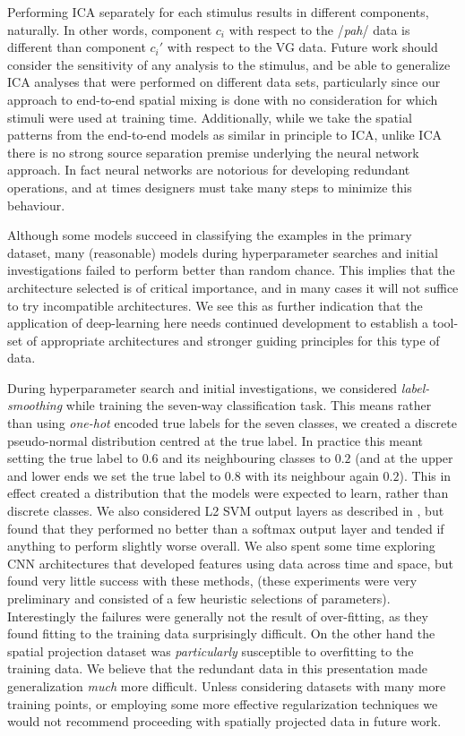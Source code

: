 \documentclass[utf8]{frontiersSCNS} %
\begin{document}
Performing ICA separately for each stimulus results in different components, naturally. In other words, component $c_i$ with respect to the /{\em pah}/ data is different than component $c_i'$ with respect to the VG data. Future work should consider the sensitivity of any analysis to the stimulus, and be able to generalize ICA analyses that were performed on different data sets, particularly since our approach to end-to-end spatial mixing is done with no consideration for which stimuli were used at training time. Additionally, while we take the spatial patterns from the end-to-end models as similar in principle to ICA, unlike ICA there is no strong source separation premise underlying the neural network approach. In fact neural networks are notorious for developing redundant operations, and at times designers must take many steps to minimize this behaviour.

Although some models succeed in classifying the examples in the primary dataset, many (reasonable) models during hyperparameter searches and initial investigations failed to perform better than random chance. This implies that the architecture selected is of critical importance, and in many cases it will not suffice to try incompatible architectures. We see this as further indication that the application of deep-learning here needs continued development to establish a tool-set of appropriate architectures and stronger guiding principles for this type of data.

During hyperparameter search and initial investigations, we considered {\em label-smoothing} \cite{Pereyra2017} while training the seven-way classification task. This means rather than using {\em one-hot} encoded true labels for the seven classes, we created a discrete pseudo-normal distribution centred at the true label. In practice this meant setting the true label to $0.6$ and its neighbouring classes to $0.2$ (and at the upper and lower ends we set the true label to $0.8$ with its neighbour again $0.2$). This in effect created a distribution that the models were expected to learn, rather than discrete classes. We also considered L2 SVM output layers as described in \cite{Tang2013a}, but found that they performed no better than a softmax output layer and tended if anything to perform slightly worse overall. We also spent some time exploring CNN architectures that developed features using data across time and space, but found very little success with these methods, (these experiments were very preliminary and consisted of a few heuristic selections of parameters). Interestingly the failures were generally not the result of over-fitting, as they found fitting to the training data surprisingly difficult. On the other hand the spatial projection dataset was {\em particularly} susceptible to overfitting to the training data. We believe that the redundant data in this presentation made generalization {\em much} more difficult. Unless considering datasets with many more training points, or employing some more effective regularization techniques we would not recommend proceeding with spatially projected data in future work. 
\end{document}
